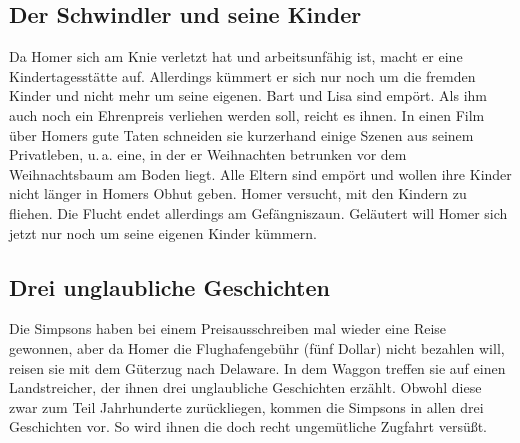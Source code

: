 	
\subsection{Der Schwindler und seine Kinder}
Da Homer sich am Knie verletzt hat und arbeitsunfähig ist, macht er eine Kindertagesstätte auf. Allerdings kümmert er sich nur noch um die fremden Kinder und nicht mehr um seine eigenen. Bart und Lisa sind empört. Als ihm auch noch ein Ehrenpreis verliehen werden soll, reicht es ihnen. In einen Film über Homers gute Taten schneiden sie kurzerhand einige Szenen aus seinem Privatleben, u.\,a. eine, in der er Weihnachten betrunken vor dem Weihnachtsbaum am Boden liegt. Alle Eltern sind empört und wollen ihre Kinder nicht länger in Homers Obhut geben. Homer versucht, mit den Kindern zu fliehen. Die Flucht endet allerdings am Gefängniszaun. Geläutert will Homer sich jetzt nur noch um seine eigenen Kinder kümmern.


\subsection{Drei unglaubliche Geschichten}
Die Simpsons haben bei einem Preisausschreiben mal wieder eine Reise gewonnen, aber da Homer die Flughafengebühr (fünf Dollar) nicht bezahlen will, reisen sie mit dem Güterzug nach Delaware. In dem Waggon treffen sie auf einen Landstreicher, der ihnen drei unglaubliche Geschichten erzählt. Obwohl diese zwar zum Teil Jahrhunderte zurückliegen, kommen die Simpsons in allen drei Geschichten vor. So wird ihnen die doch recht ungemütliche Zugfahrt versüßt.

